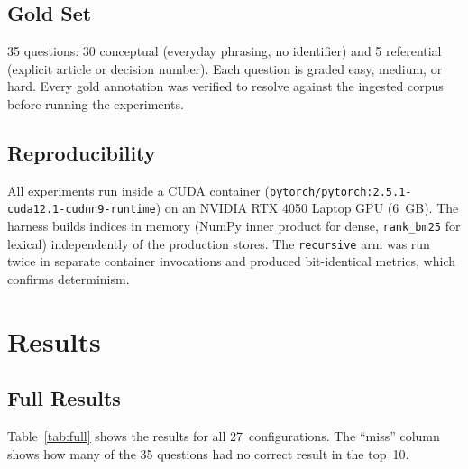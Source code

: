 \documentclass[11pt,a4paper,twocolumn]{article}
\begin{document}
\subsection{Gold Set}

35 questions: 30 conceptual (everyday phrasing, no identifier) and 5 referential (explicit article or decision number). Each question is graded easy, medium, or hard. Every gold annotation was verified to resolve against the ingested corpus before running the experiments.

\subsection{Reproducibility}

All experiments run inside a CUDA container (\texttt{pytorch/pytorch:2.5.1-cuda12.1-cudnn9-runtime}) on an NVIDIA RTX 4050 Laptop GPU (6~GB). The harness builds indices in memory (NumPy inner product for dense, \texttt{rank\_bm25} for lexical) independently of the production stores. The \texttt{recursive} arm was run twice in separate container invocations and produced bit-identical metrics, which confirms determinism.


\section{Results}
\label{sec:results}

\subsection{Full Results}

Table~\ref{tab:full} shows the results for all 27~configurations. The ``miss'' column shows how many of the 35 questions had no correct result in the top~10.
\end{document}
